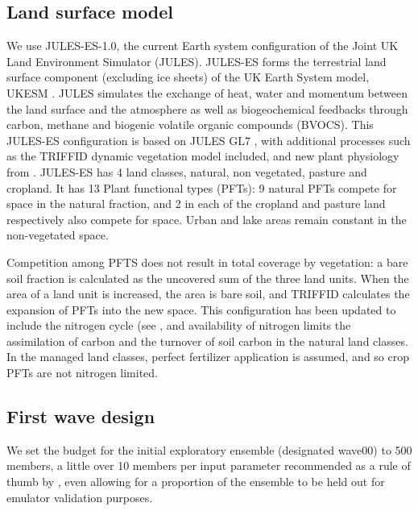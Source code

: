 \documentclass[gmd, manuscript]{copernicus}
\begin{document}
\subsection{Land surface model}\label{ssec:land_surface_model}

We use JULES-ES-1.0, the current Earth system configuration of the Joint UK Land Environment Simulator (JULES). JULES-ES forms the terrestrial land surface component (excluding ice sheets) of the UK Earth System model, UKESM \citep{sellar2019UKESM}. JULES simulates the exchange of heat, water and momentum between the land surface and the atmosphere as well as biogeochemical feedbacks through carbon, methane and biogenic volatile organic compounds (BVOCS). This JULES-ES configuration is based on JULES GL7 \citep{wiltshire2020jules}, with additional processes such as the TRIFFID dynamic vegetation model \citep{cox2001description} included, and new plant physiology from \cite{harper2018vegetation}. JULES-ES has 4 land classes, natural, non vegetated, pasture and cropland. It has 13 Plant functional types (PFTs): 9 natural PFTs compete for space in the natural fraction, and 2 in each of the cropland and pasture land respectively also compete for space. Urban and lake areas remain constant in the non-vegetated space.

Competition among PFTS does not result in total coverage by vegetation: a bare soil fraction is calculated as the uncovered sum of the three land units. When the area of a land unit is increased, the area is bare soil, and TRIFFID calculates the expansion of PFTs into the new space. This configuration has been updated to include the nitrogen cycle (see \citep{wiltshire2021julescn}, and availability of nitrogen limits the assimilation of carbon and the turnover of soil carbon in the natural land classes. In the managed land classes, perfect fertilizer application is assumed, and so crop PFTs are not nitrogen limited.

\subsection{First wave design}\label{ssec:first_wave_design}

We set the budget for the initial exploratory ensemble (designated wave00) to 500 members, a little over 10 members per input parameter recommended as a rule of thumb by \cite{loeppky2012choosing}, even allowing for a proportion of the ensemble to be held out for emulator validation purposes.
\end{document}
